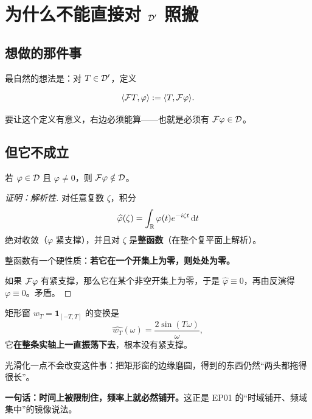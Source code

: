 \section{为什么不能直接对 $\mathcal{D}'$ 照搬}

\subsection{想做的那件事}

最自然的想法是：对 $T\in\mathcal{D}'$，定义

\begin{equation}
\langle \mathcal{F} T,\varphi\rangle:=\langle T,\mathcal{F}\varphi\rangle .
\end{equation}

要让这个定义有意义，右边必须能算——也就是必须有 $\mathcal{F}\varphi\in\mathcal{D}$。

\subsection{但它不成立}

\begin{prop}\label{prop:F-not-D}
若 $\varphi\in\mathcal{D}$ 且 $\varphi\neq0$，则 $\mathcal{F}\varphi\notin\mathcal{D}$。
\end{prop}

\begin{proof}[证明：解析性]
对任意复数 $\zeta$，积分
\begin{equation}
\widehat{\varphi}(\zeta)=\int_{\mathbb{R}}\varphi(t)e^{-i\zeta t}\mathop{}\!\mathrm{d} t
\end{equation}
绝对收敛（$\varphi$ 紧支撑），并且对 $\zeta$ 是\textbf{整函数}（在整个复平面上解析）。

整函数有一个硬性质：\textbf{若它在一个开集上为零，则处处为零。}

如果 $\mathcal{F}\varphi$ 有紧支撑，那么它在某个非空开集上为零，于是 $\widehat\varphi\equiv0$，再由反演得 $\varphi\equiv0$。矛盾。
\end{proof}

\begin{ideabox}[一个不用复分析的直观版本]
矩形窗 $w_T=\mathbf{1}_{[-T,T]}$ 的变换是
\begin{equation}
\widehat{w_T}(\omega)=\frac{2\sin(T\omega)}{\omega},
\end{equation}
它\textbf{在整条实轴上一直振荡下去}，根本没有紧支撑。

光滑化一点不会改变这件事：把矩形窗的边缘磨圆，得到的东西仍然“两头都拖得很长”。

\textbf{一句话：时间上被限制住，频率上就必然铺开。}这正是 EP01 的“时域铺开、频域集中”的镜像说法。
\end{ideabox}

